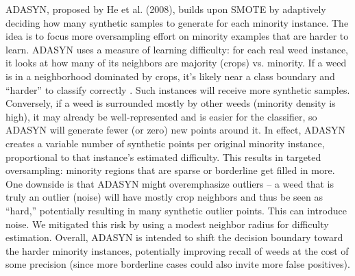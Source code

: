 \documentclass[agriengineering,article,submit,pdftex,moreauthors]{Definitions/mdpi}
\begin{document}
ADASYN, proposed by He et al. (2008), builds upon SMOTE by adaptively deciding how many synthetic samples to generate for each minority instance. The idea is to focus more oversampling effort on minority examples that are harder to learn. ADASYN uses a measure of learning difficulty: for each real weed instance, it looks at how many of its neighbors are majority (crops) vs. minority. If a weed is in a neighborhood dominated by crops, it’s likely near a class boundary and “harder” to classify correctly \cite{He2008-xr}. Such instances will receive more synthetic samples. Conversely, if a weed is surrounded mostly by other weeds (minority density is high), it may already be well-represented and is easier for the classifier, so ADASYN will generate fewer (or zero) new points around it. In effect, ADASYN creates a variable number of synthetic points per original minority instance, proportional to that instance’s estimated difficulty. This results in targeted oversampling: minority regions that are sparse or borderline get filled in more. One downside is that ADASYN might overemphasize outliers – a weed that is truly an outlier (noise) will have mostly crop neighbors and thus be seen as “hard,” potentially resulting in many synthetic outlier points. This can introduce noise. We mitigated this risk by using a modest neighbor radius for difficulty estimation. Overall, ADASYN is intended to shift the decision boundary toward the harder minority instances, potentially improving recall of weeds at the cost of some precision (since more borderline cases could also invite more false positives).
\end{document}
